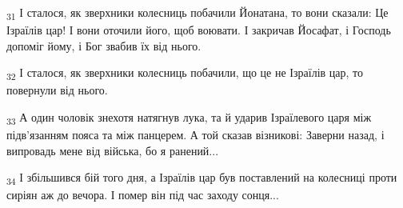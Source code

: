 \begin{tcolorbox}
\textsubscript{31} І сталося, як зверхники колесниць побачили Йонатана, то вони сказали: Це Ізраїлів цар! І вони оточили його, щоб воювати. І закричав Йосафат, і Господь допоміг йому, і Бог звабив їх від нього.
\end{tcolorbox}
\begin{tcolorbox}
\textsubscript{32} І сталося, як зверхники колесниць побачили, що це не Ізраїлів цар, то повернули від нього.
\end{tcolorbox}
\begin{tcolorbox}
\textsubscript{33} А один чоловік знехотя натягнув лука, та й ударив Ізраїлевого царя між підв'язанням пояса та між панцерем. А той сказав візникові: Заверни назад, і випровадь мене від війська, бо я ранений...
\end{tcolorbox}
\begin{tcolorbox}
\textsubscript{34} І збільшився бій того дня, а Ізраїлів цар був поставлений на колесниці проти сиріян аж до вечора. І помер він під час заходу сонця...
\end{tcolorbox}
